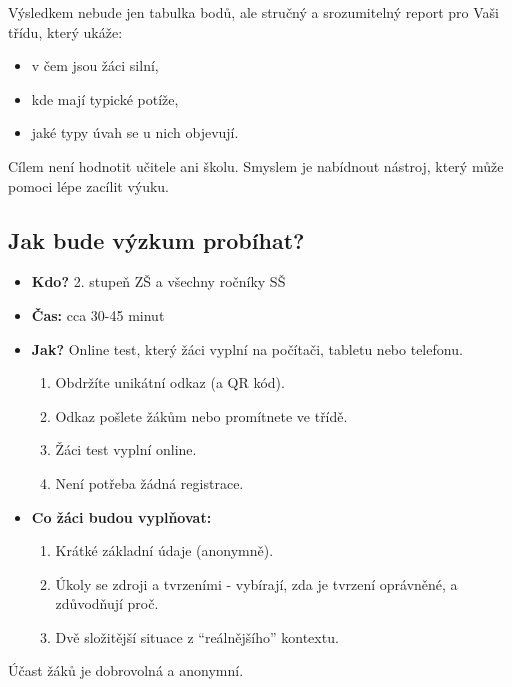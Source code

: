 \documentclass[
  12pt,
  english,
  a4paper,
  extrafontsizes,onecolumn,openright
  ]{memoir}
\providecommand{\tightlist}{%
  \setlength{\itemsep}{0pt}\setlength{\parskip}{0pt}}
\begin{document}
Výsledkem nebude jen tabulka bodů, ale stručný a srozumitelný report pro
Vaši třídu, který ukáže:

\begin{itemize}
\tightlist
\item
  v čem jsou žáci silní,
\item
  kde mají typické potíže,
\item
  jaké typy úvah se u nich objevují.
\end{itemize}

Cílem není hodnotit učitele ani školu.
Smyslem je nabídnout nástroj, který může pomoci lépe zacílit výuku.

\subsection{Jak bude výzkum probíhat?}\label{jak-bude-vuxfdzkum-probuxedhat}

\begin{itemize}
\tightlist
\item
  \textbf{Kdo?} 2. stupeň ZŠ a všechny ročníky SŠ
\item
  \textbf{Čas:} cca 30-45 minut
\item
  \textbf{Jak?} Online test, který žáci vyplní na počítači, tabletu nebo telefonu.

  \begin{enumerate}
  \def\labelenumi{\arabic{enumi}.}
  \tightlist
  \item
    Obdržíte unikátní odkaz (a QR kód).
  \item
    Odkaz pošlete žákům nebo promítnete ve třídě.
  \item
    Žáci test vyplní online.
  \item
    Není potřeba žádná registrace.
  \end{enumerate}
\item
  \textbf{Co žáci budou vyplňovat:}

  \begin{enumerate}
  \def\labelenumi{\arabic{enumi}.}
  \tightlist
  \item
    Krátké základní údaje (anonymně).
  \item
    Úkoly se zdroji a tvrzeními - vybírají, zda je tvrzení
    oprávněné, a zdůvodňují proč.
  \item
    Dvě složitější situace z \enquote{reálnějšího} kontextu.
  \end{enumerate}
\end{itemize}

Účast žáků je dobrovolná a anonymní.
\end{document}
